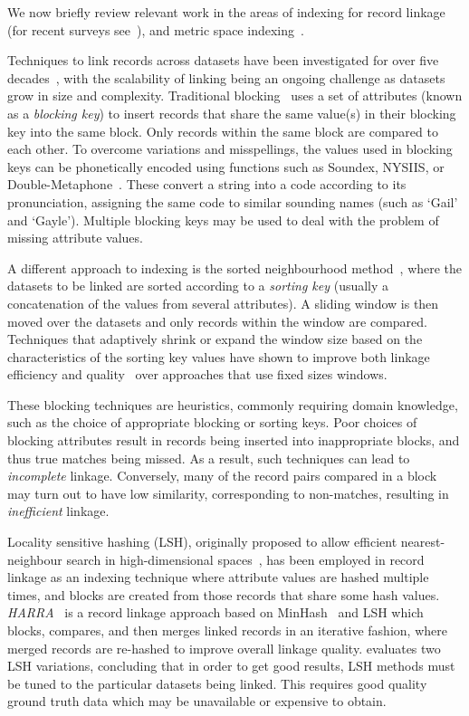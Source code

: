 \documentclass{llncs}
\begin{document}
We now briefly review relevant work in the areas of indexing for record
linkage (for recent surveys see~\cite{Chr12b,Pap16}), and metric space
indexing~\cite{Zezula2010}.

Techniques to link records across datasets have been investigated for
over five decades~\cite{Fel69,New59}, with the scalability of linking
being an ongoing challenge as datasets grow in size and complexity.
Traditional blocking~\cite{Chr12b} uses a set of attributes (known as a
\emph{blocking key}) to insert records that share the same value(s) in
their blocking key into the same block. Only records within the same
block are  compared to each other. To overcome variations and
misspellings, the values used in blocking keys can be phonetically
encoded using functions such as Soundex, NYSIIS, or
Double-Metaphone~\cite{Chr12}. These convert a string into a code
according to its pronunciation, assigning the same code to similar
sounding names (such as `Gail' and `Gayle'). Multiple blocking keys
may be used to deal with the problem of missing attribute values.

A different approach to indexing is the sorted neighbourhood
method~\cite{Mon96}, where the datasets to be linked are sorted
according to a \emph{sorting key} (usually a concatenation of the values
from several attributes). A sliding window is then moved over the
datasets and only records within the window are compared. Techniques
that adaptively shrink or expand the window size based on the
characteristics of the sorting key values have shown to improve both
linkage efficiency and quality~\cite{Dra12} over
approaches that use fixed sizes windows.

These blocking techniques are heuristics, commonly requiring domain
knowledge, such as the choice of appropriate blocking or sorting keys.
Poor choices of blocking attributes result in records being inserted
into inappropriate blocks, and thus true matches being missed. As a
result, such techniques can lead to \emph{incomplete} linkage.
Conversely, many of the record pairs compared in a block may turn
out to have low similarity, corresponding to non-matches, resulting in
\emph{inefficient} linkage.

Locality sensitive hashing (LSH), originally proposed to allow efficient
nearest-neighbour search in high-dimensional spaces~\cite{Ind98}, has
been employed in record linkage as an indexing technique where attribute
values are hashed multiple times, and blocks are created from those
records that share some hash values. \emph{HARRA}~\cite{Kim10} is a
record linkage approach based on MinHash~\cite{Broder1997} and LSH
which blocks, compares, and then merges linked records in an iterative
fashion, where merged records are re-hashed to improve overall linkage
quality. \cite{Steorts2014} evaluates two LSH variations, concluding
that in order to get good results, LSH methods must be tuned to the
particular datasets being linked. This requires good quality ground
truth data which may be unavailable or expensive to obtain.
\end{document}
